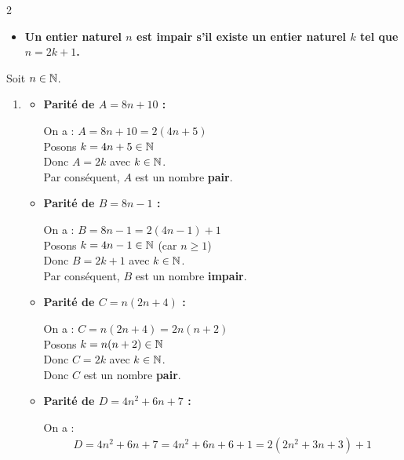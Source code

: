 \documentclass[10pt, a4paper]{article}
\begin{document}
\begin{multicols*}{2}
\begin{Solution}[ACTIVITÉ][1]
\begin{enumerate}[leftmargin=*,itemsep=0.5pt]
    \begin{itemize}[label=$\blacktriangleright$, leftmargin=*, nosep]
    \item \textbf{Un entier naturel $n$ est \textcolor{PrimaryColor}{impair} s'il existe un entier naturel $k$ tel que $n = 2k+1$.}
\end{itemize}
\end{enumerate}
\end{Solution}

\begin{Solution}[APPLICATION][1]
Soit $n \in \mathbb{N}$.
\begin{enumerate}[leftmargin=*,itemsep=0.5pt]
    \item
    \begin{itemize}[leftmargin=*,itemsep=0.5pt]
        \item \textbf{Parité de $A = 8n + 10$ :}

    On a : $A = 8n + 10 = 2(4n + 5)$ \\
    Posons $k = 4n + 5 \in \mathbb{N}$ \\
    Donc $A = 2k$ avec $k \in \mathbb{N}$. \\
    Par conséquent, $A$ est un nombre \textbf{pair}.

        \item \textbf{Parité de $B = 8n - 1$ :}

    On a : $B = 8n - 1 = 2(4n - 1) + 1$ \\
    Posons $k = 4n - 1 \in \mathbb{N}$ (car $n \geq 1$) \\
    Donc $B = 2k + 1$ avec $k \in \mathbb{N}$. \\
    Par conséquent, $B$ est un nombre \textbf{impair}.

        \item \textbf{Parité de $C = n(2n + 4)$ :}

    On a : $C = n(2n + 4) = 2n(n + 2)$ \\
    Posons $k = n(n + 2) \in \mathbb{N}$ \\
    Donc $C = 2k$ avec $k \in \mathbb{N}$. \\
    Donc $C$ est un nombre \textbf{pair}.


        \item \textbf{Parité de $D = 4n^2 + 6n + 7$ :}

    On a :
    \begin{align*}
        D = 4n^2 + 6n + 7
          = 4n^2 + 6n + 6 + 1
          = 2(2n^2 + 3n + 3) + 1
    \end{align*}


\end{itemize}
\end{enumerate}
\end{Solution}
\end{multicols*}
\end{document}
